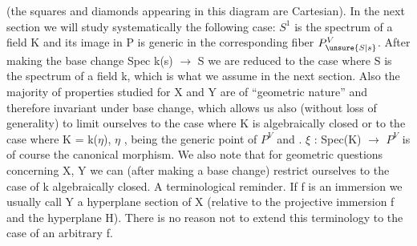 
(the squares and diamonds appearing in this diagram are
Cartesian). In the next section we will study systematically the
following case: $S^{1}$ is the spectrum of a field K and its image in P
is generic in the corresponding fiber $P^{V}_{\unsure{S|s}}$. After making the base
change Spec k(s) $\rightarrow$ S we are reduced to the case where S is the
spectrum of a field k, which is what we assume in the next
section. Also the majority of properties studied for X and Y are
of ``geometric nature'' and therefore invariant under base change,
which allows us also (without loss of generality) to limit
ourselves to the case where K is algebraically closed or to the
case where K = k($\eta$), $\eta$ , being the generic point of $P^{V}$ and . $\xi$ :
Spec(K) $\rightarrow$ $P^{V}$ is of course the canonical morphism. We also note
that for geometric questions concerning X, Y we can (after making
a base change) restrict ourselves to the case of k algebraically
closed. A terminological reminder. If f is an immersion we
usually call Y a hyperplane section of X (relative to the
projective immersion f and the hyperplane H). There is no reason
not to extend this terminology to the case of an arbitrary f.

